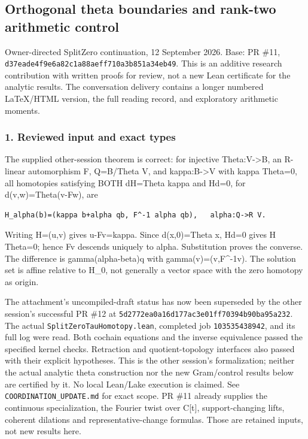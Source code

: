 \subsection{Orthogonal theta boundaries and rank-two arithmetic
control}\label{pr_13:orthogonal-theta-boundaries-and-rank-two-arithmetic-control}

Owner-directed SplitZero continuation, 12 September 2026. Base: PR \#11,
\nolinkurl{d37eade4f9e6a82c1a88aeff710a3b851a34eb49}. This is an additive research contribution with written
proofs for review, not a new Lean certificate for the analytic results. The conversation delivery
contains a longer numbered LaTeX/HTML version, the full reading record, and exploratory arithmetic
moments.

\subsubsection{1. Reviewed input and exact types}\label{pr_13:reviewed-input-and-exact-types}

The supplied other-session theorem is correct: for injective Theta:V-\textgreater B, an R-linear
automorphism F, Q=B/Theta V, and kappa:B-\textgreater V with kappa Theta=0, all homotopies
satisfying BOTH dH=Theta kappa and Hd=0, for d(v,w)=Theta(v-Fw), are

\begin{verbatim}
H_alpha(b)=(kappa b+alpha qb, F^-1 alpha qb),   alpha:Q->R V.
\end{verbatim}

Writing H=(u,v) gives u-Fv=kappa. Since d(x,0)=Theta x, Hd=0 gives H Theta=0; hence Fv descends
uniquely to alpha. Substitution proves the converse. The difference is gamma(alpha-beta)q with
gamma(v)=(v,F\^{}-1v). The solution set is affine relative to H\_0, not generally a vector space
with the zero homotopy as origin.

The attachment's uncompiled-draft status has now been superseded by the other session's successful
PR \#12 at \nolinkurl{5d2772ea0a16d177ac3e01ff70394b90ba95a232}. The actual
\nolinkurl{SplitZeroTauHomotopy.lean}, completed job \nolinkurl{103535438942}, and its full log were read.
Both cochain equations and the inverse equivalence passed the specified kernel checks. Retraction
and quotient-topology interfaces also passed with their explicit hypotheses. This is the other
session's formalization; neither the actual analytic theta construction nor the new Gram/control
results below are certified by it. No local Lean/Lake execution is claimed. See
\nolinkurl{COORDINATION_UPDATE.md} for exact scope. PR \#11 already supplies the continuous
specialization, the Fourier twist over C{[}t{]}, support-changing lifts, coherent dilations and
representative-change formulas. Those are retained inputs, not new results here.


